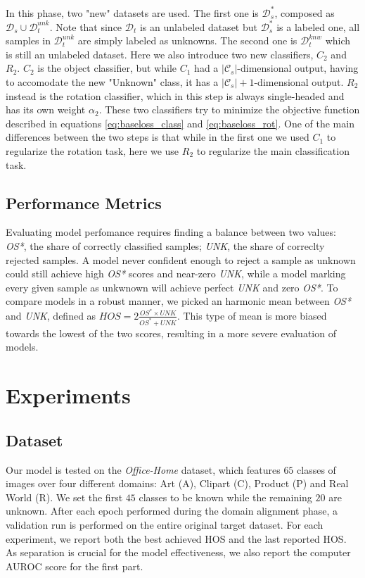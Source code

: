 \documentclass[10pt,twocolumn,letterpaper]{article}
\begin{document}
In this phase, two "new" datasets are used.
The first one is $\mathcal{D}_s^*$, composed as $\mathcal{D}_s \cup \mathcal{D}_t^{unk}$.
Note that since $\mathcal{D}_t$ is an unlabeled dataset but $\mathcal{D}_s^*$ is a labeled one, all samples in $\mathcal{D}_t^{unk}$ are simply labeled as unknowns.
The second one is $\mathcal{D}_t^{knw}$ which is still an unlabeled dataset.
Here we also introduce two new classifiers, $C_2$ and $R_2$.
$C_2$ is the object classifier, but while $C_1$ had a $|\mathcal{C}_s|$-dimensional output, having to accomodate the new "Unknown" class, it has a $|\mathcal{C}_s|+1$-dimensional output.
$R_2$ instead is the rotation classifier, which in this step is always single-headed and has its own weight $\alpha_2$.
These two classifiers try to minimize the objective function described in equations \ref{eq:baseloss_class} and \ref{eq:baseloss_rot}.
One of the main differences between the two steps is that while in the first one we used $C_1$ to regularize the rotation task, here we use $R_2$ to regularize the main classification task.

\subsection{Performance Metrics}
\label{sec:performance_metrics}

Evaluating model perfomance requires finding a balance between two values:
{\it OS*}, the share of correctly classified samples;
{\it UNK}, the share of correclty rejected samples.
A model never confident enough to reject a sample as unknown could still achieve high {\it OS*} scores and near-zero {\it UNK}, while a model marking every given sample as unkwnown will achieve perfect {\it UNK} and zero {\it OS*}.
To compare models in a robust manner, we picked an harmonic mean between {\it OS*} and {\it UNK}, defined as $HOS = 2\frac{OS^*\times UNK}{OS^*+UNK}$.
This type of mean is more biased towards the lowest of the two scores, resulting in a more severe evaluation of models.

\section{Experiments}
\label{sec:experiments}

\subsection{Dataset}
\label{sec:dataset}

Our model is tested on the {\it Office-Home} dataset\cite{OfficeHomeDataset}, which features $65$ classes of images over four different domains: Art (A), Clipart (C), Product (P) and Real World (R).
We set the first $45$ classes to be known while the remaining $20$ are unknown.
After each epoch performed during the domain alignment phase, a validation run is performed on the entire original target dataset.
For each experiment, we report both the best achieved HOS and the last reported HOS.
As separation is crucial for the model effectiveness, we also report the computer AUROC score for the first part.
\end{document}
